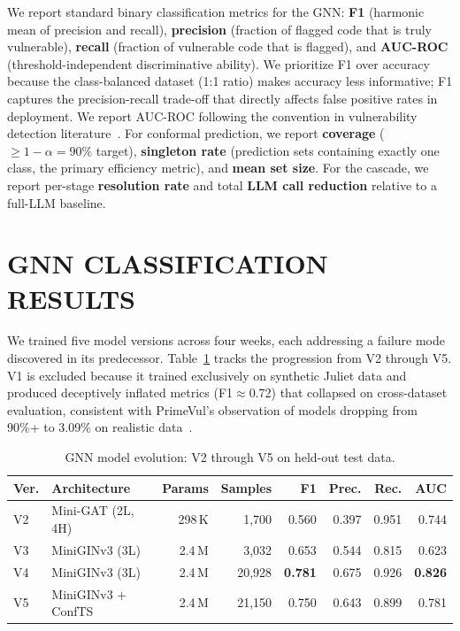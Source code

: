 We report standard binary classification metrics for the GNN:
\textbf{F1} (harmonic mean of precision and recall),
\textbf{precision} (fraction of flagged code that is truly vulnerable),
\textbf{recall} (fraction of vulnerable code that is flagged), and
\textbf{AUC-ROC} (threshold-independent discriminative ability).
We prioritize F1 over accuracy because the class-balanced dataset (1:1 ratio)
makes accuracy less informative; F1 captures the precision-recall trade-off
that directly affects false positive rates in deployment.
We report AUC-ROC following the convention in vulnerability detection
literature~\cite{devign2019, primevul2024}.
For conformal prediction, we report \textbf{coverage}
($\geq 1 - \alpha = 90\%$ target), \textbf{singleton rate}
(prediction sets containing exactly one class, the primary efficiency metric),
and \textbf{mean set size}.
For the cascade, we report per-stage \textbf{resolution rate} and
total \textbf{LLM call reduction} relative to a full-LLM baseline.

\section{\uppercase{GNN Classification Results}}
\label{sec:gnn-evolution}

We trained five model versions across four weeks, each addressing a failure mode discovered in its predecessor. Table~\ref{tab:gnn-evolution} tracks the progression from V2 through V5. V1 is excluded because it trained exclusively on synthetic Juliet data and produced deceptively inflated metrics (F1$\approx$0.72) that collapsed on cross-dataset evaluation, consistent with PrimeVul's observation of models dropping from 90\%+ to 3.09\% on realistic data~\cite{primevul2024}.

\begin{table}[H]
\centering
\small
\caption{GNN model evolution: V2 through V5 on held-out test data.}
\label{tab:gnn-evolution}
\begin{tabular}{@{}llrrrrrr@{}}
\toprule
\textbf{Ver.} & \textbf{Architecture} & \textbf{Params} & \textbf{Samples} & \textbf{F1} & \textbf{Prec.} & \textbf{Rec.} & \textbf{AUC} \\
\midrule
V2 & Mini-GAT (2L, 4H) & 298\,K & 1,700 & 0.560 & 0.397 & 0.951 & 0.744 \\
V3 & MiniGINv3 (3L) & 2.4\,M & 3,032 & 0.653 & 0.544 & 0.815 & 0.623 \\
V4 & MiniGINv3 (3L) & 2.4\,M & 20,928 & \textbf{0.781} & 0.675 & 0.926 & \textbf{0.826} \\
V5 & MiniGINv3 + ConfTS & 2.4\,M & 21,150 & 0.750 & 0.643 & 0.899 & 0.781 \\
\bottomrule
\end{tabular}
\end{table}


